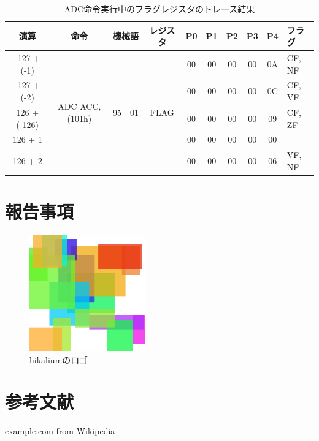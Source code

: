 \begin{table}[htb]
\caption{ADC命令実行中のフラグレジスタのトレース結果}
\begin{center}
\begin{tabular}
{c|c|c|c|c|c|c|c|c|c|l}
\hline
演算 & 命令 & \multicolumn{2}{c|}{機械語} & レジスタ & P0 & P1 & P2 & P3 & P4 & フラグ  \\ \hline

-127 + (-1)&
\multirow{5}{*}{ADC ACC, (101h)}&
\multirow{5}{*}{95} & \multirow{5}{*}{01} 
		& \multirow{5}{*}{FLAG}	& 00 & 00 & 00 & 00 & 0A & CF, NF \\
\cline{1-1} \cline{6-11}

-127 + (-2) & & & & & 00 & 00 & 00 & 00 & 0C & CF, VF \\
\cline{1-1} \cline{6-11}
126 + (-126) & & & & & 00 & 00 & 00 & 00 & 09 & CF, ZF \\
\cline{1-1} \cline{6-11}
126 + 1 & & & & & 00 & 00 & 00 & 00 & 00 &  \\
\cline{1-1} \cline{6-11}
126 + 2 & & & & & 00 & 00 & 00 & 00 & 06 & VF, NF \\
\hline

\end{tabular}
\end{center}
\label{adctrace}
\end{table}


\section{報告事項}

\begin{figure}[p]
\centering
\includegraphics[height=5cm]{sample/logo.png}
\caption{hikaliumのロゴ}
\label{logo}
\end{figure}




\section{参考文献}
\begingroup
\renewcommand{\section}[2]{}
\begin{thebibliography}{3}
	 example.com from Wikipedia
\end{thebibliography}
\endgroup



